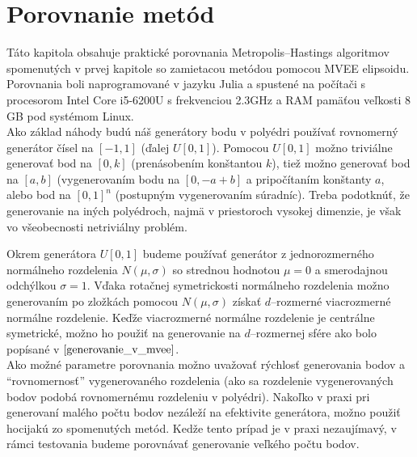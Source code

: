 \chapter{Porovnanie metód}

Táto kapitola obsahuje praktické porovnania Metropolis--Hastings algoritmov spomenutých v prvej kapitole so zamietacou metódou pomocou MVEE elipsoidu. Porovnania boli naprogramované v jazyku Julia a spustené na počítači s procesorom Intel Core i5-6200U s frekvenciou 2.3GHz a RAM pamäťou veľkosti 8 GB pod systémom Linux.\\

Ako základ náhody budú náš generátory bodu v polyédri používať rovnomerný generátor čísel na $[-1,1]$ (ďalej $U[0,1]$). Pomocou $U[0,1]$ možno triviálne generovať bod na $[0,k]$ (prenásobením konštantou $k$), tiež možno generovať bod na $[a,b]$ (vygenerovaním bodu na $[0, -a+b]$ a pripočítaním konštanty $a$, alebo bod na $[0,1]^n$ (postupným vygenerovaním súradníc). Treba podotknúť, že generovanie na iných polyédroch, najmä v priestoroch vysokej dimenzie, je však vo všeobecnosti netriviálny problém.

Okrem generátora $U[0,1]$ budeme používať generátor z jednorozmerného normálneho rozdelenia $N(\mu, \sigma)$ so strednou hodnotou $\mu=0$ a smerodajnou odchýlkou $\sigma=1$. Vďaka rotačnej symetrickosti normálneho rozdelenia možno generovaním po zložkách pomocou $N(\mu, \sigma)$ získať $d$--rozmerné viacrozmerné normálne rozdelenie.
Keďže viacrozmerné normálne rozdelenie je centrálne symetrické, možno ho použiť na generovanie na $d$--rozmernej sfére ako bolo popísané v $\ref{generovanie_v_mvee}$.\\

Ako možné parametre porovnania možno uvažovať rýchlosť generovania bodov a ``rovnomernosť'' vygenerovaného rozdelenia (ako sa rozdelenie vygenerovaných bodov podobá rovnomernému rozdeleniu v polyédri).
Nakoľko v praxi pri generovaní malého počtu bodov nezáleží na efektivite generátora, možno použiť hocijakú zo spomenutých metód. Kedže tento prípad je v praxi nezaujímavý, v rámci testovania budeme porovnávať generovanie veľkého počtu bodov.

